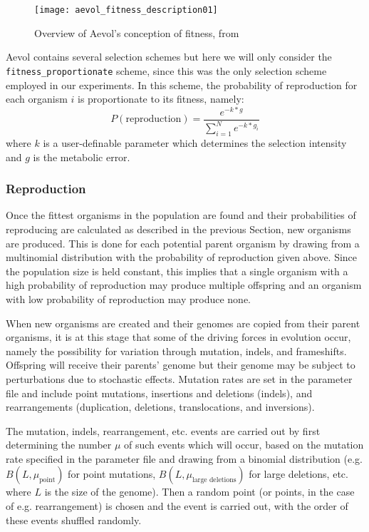\begin{figure}[h]
	\texttt{[image: aevol\_fitness\_description01]}
	\centering
	\caption[Overview of Aevol's concept of fitness.]{Overview of Aevol's conception of fitness, from \cite{knibbe:tel-00482375}}
	\label{fig:aevol_fitness01}
\end{figure}

Aevol contains several selection schemes but here we will only consider the \texttt{fitness\_proportionate} scheme, since this was the only selection scheme employed in our experiments. In this scheme, the probability of reproduction for each organism $i$ is proportionate to its fitness, namely:
\begin{equation*}
P(\text{reproduction}) = \frac{e^{-k * g}}{\sum_{i=1}^{N} e^{-k * g_i}}
\end{equation*} 
where $k$ is a user-definable parameter which determines the selection intensity and $g$ is the metabolic error.
\subsubsection{Reproduction}\label{subsec:aevol_reproduction}
Once the fittest organisms in the population are found and their probabilities of reproducing are calculated as described in the previous Section, new organisms are produced. This is done for each potential parent organism by drawing from a multinomial distribution with the probability of reproduction given above. Since the population size is held constant, this implies that a single organism with a high probability of reproduction may produce multiple offspring and an organism with low probability of reproduction may produce none.

When new organisms are created and their genomes are copied from their parent organisms, it is at this stage that some of the driving forces in evolution occur, namely the possibility for variation through mutation, indels, and frameshifts. Offspring will receive their parents' genome but their genome may be subject to perturbations due to stochastic effects. Mutation rates are set in the parameter file and include point mutations, insertions and deletions (indels), and rearrangements (duplication, deletions, translocations, and inversions).

The mutation, indels, rearrangement, etc. events are carried out by first determining the number $\mu$ of such events which will occur, based on the mutation rate specified in the parameter file and drawing from a binomial distribution (e.g. $B(L, \mu_\text{point})$ for point mutations, $B(L, \mu_\text{large deletions})$ for large deletions, etc. where $L$ is the size of the genome). Then a random point (or points, in the case of e.g. rearrangement) is chosen and the event is carried out, with the order of these events shuffled randomly. 

